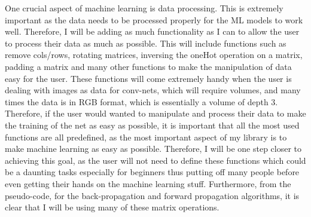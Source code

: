 One crucial aspect of machine learning is data processing. This is extremely important as the data needs to be processed properly for the ML models to work well. Therefore, I will be adding as much functionality as I can to allow the user to process their data as much as possible. This will include functions such as remove cols/rows, rotating matrices, inversing the oneHot operation on a matrix, padding a matrix and many other functions to make the manipulation of data easy for the user. These functions will come extremely handy when the user is dealing with images as data for conv-nets, which will require volumes, and many times the data is in RGB format, which is essentially a volume of depth 3. Therefore, if the user would wanted to manipulate and process their data to make the training of the net as easy as possible, it is important that all the most used functions are all predefined, as the most important aspect of my library is to make machine learning as easy as possible. Therefore, I will be one step closer to achieving this goal, as the user will not need to define these functions which could be a daunting tasks especially for beginners thus putting off many people before even getting their hands on the machine learning stuff. Furthermore, from the pseudo-code, for the back-propagation and forward propagation algorithms, it is clear that I will be using many of these matrix operations.
